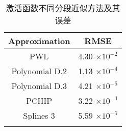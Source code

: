 
\begin{center}
\begin{table}
	\caption{激活函数不同分段近似方法及其误差}
	\renewcommand\arraystretch{1.2}
	\setlength{\tabcolsep}{60pt}
	\begin{tabular}{cc}
		\toprule
		Approximation			&				RMSE		\\	\midrule
		PWL						&				4.30 \(\times 10^{-2}\)		 	\\	
		Polynomial D.2			&				1.13 \(\times 10^{-4}\)			\\
		Polynomial D.3			&				4.21 \(\times 10^{-6}\)			\\
		PCHIP					&				3.22 \(\times 10^{-4}\)			\\
		Splines 3				&				5.59 \(\times 10^{-5}\)			\\
	\bottomrule
	\label{tab:accuracy}
	\end{tabular}
\end{table}
\end{center}
